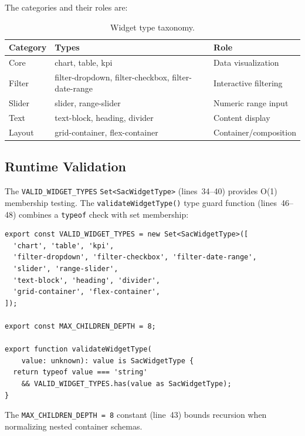 \documentclass[11pt]{article}
\begin{document}
\noindent The categories and their roles are:

\begin{table}[h]
\centering
\begin{tabular}{lll}
\toprule
\textbf{Category} & \textbf{Types} & \textbf{Role} \\
\midrule
Core         & chart, table, kpi                          & Data visualization \\
Filter       & filter-dropdown, filter-checkbox, filter-date-range & Interactive filtering \\
Slider       & slider, range-slider                       & Numeric range input \\
Text         & text-block, heading, divider               & Content display \\
Layout       & grid-container, flex-container              & Container/composition \\
\bottomrule
\end{tabular}
\caption{Widget type taxonomy.}
\label{tab:types}
\end{table}

\subsection{Runtime Validation}

The \texttt{VALID\_WIDGET\_TYPES} \texttt{Set<SacWidgetType>} (lines~34--40)
provides O(1) membership testing. The \texttt{validateWidgetType()} type guard
function (lines~46--48) combines a \texttt{typeof} check with set membership:

\begin{lstlisting}[language={[Sharp]C},caption={Runtime type guard (sac-widget-schema.ts:34--48)}]
export const VALID_WIDGET_TYPES = new Set<SacWidgetType>([
  'chart', 'table', 'kpi',
  'filter-dropdown', 'filter-checkbox', 'filter-date-range',
  'slider', 'range-slider',
  'text-block', 'heading', 'divider',
  'grid-container', 'flex-container',
]);

export const MAX_CHILDREN_DEPTH = 8;

export function validateWidgetType(
    value: unknown): value is SacWidgetType {
  return typeof value === 'string'
    && VALID_WIDGET_TYPES.has(value as SacWidgetType);
}
\end{lstlisting}

\noindent The \texttt{MAX\_CHILDREN\_DEPTH = 8} constant (line~43) bounds
recursion when normalizing nested container schemas.
\end{document}
